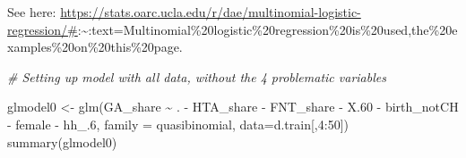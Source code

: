 \documentclass[
]{article}
\newenvironment{Shaded}{\begin{snugshade}}{\end{snugshade}}
\newcommand{\AttributeTok}[1]{\textcolor[rgb]{0.77,0.63,0.00}{#1}}
\newcommand{\CommentTok}[1]{\textcolor[rgb]{0.56,0.35,0.01}{\textit{#1}}}
\newcommand{\DecValTok}[1]{\textcolor[rgb]{0.00,0.00,0.81}{#1}}
\newcommand{\FloatTok}[1]{\textcolor[rgb]{0.00,0.00,0.81}{#1}}
\newcommand{\FunctionTok}[1]{\textcolor[rgb]{0.00,0.00,0.00}{#1}}
\newcommand{\NormalTok}[1]{#1}
\newcommand{\OtherTok}[1]{\textcolor[rgb]{0.56,0.35,0.01}{#1}}
\newcommand{\SpecialCharTok}[1]{\textcolor[rgb]{0.00,0.00,0.00}{#1}}
\begin{document}
See here:
\url{https://stats.oarc.ucla.edu/r/dae/multinomial-logistic-regression/\#}:\textasciitilde:text=Multinomial\%20logistic\%20regression\%20is\%20used,the\%20examples\%20on\%20this\%20page.

\begin{Shaded}
\begin{Highlighting}[]
\CommentTok{\# Setting up model with all data, without the 4 problematic variables}

\NormalTok{glmodel0 }\OtherTok{\textless{}{-}} \FunctionTok{glm}\NormalTok{(GA\_share }\SpecialCharTok{\textasciitilde{}}\NormalTok{ . }\SpecialCharTok{{-}}\NormalTok{ HTA\_share }\SpecialCharTok{{-}}\NormalTok{ FNT\_share }\SpecialCharTok{{-}} 
\NormalTok{                   X}\FloatTok{.60} \SpecialCharTok{{-}}\NormalTok{ birth\_notCH }\SpecialCharTok{{-}}\NormalTok{ female }\SpecialCharTok{{-}}\NormalTok{ hh\_}\FloatTok{.6}\NormalTok{, }
                \AttributeTok{family =}\NormalTok{ quasibinomial, }\AttributeTok{data=}\NormalTok{d.train[,}\DecValTok{4}\SpecialCharTok{:}\DecValTok{50}\NormalTok{])}
\FunctionTok{summary}\NormalTok{(glmodel0)}
\end{Highlighting}
\end{Shaded}
\end{document}
